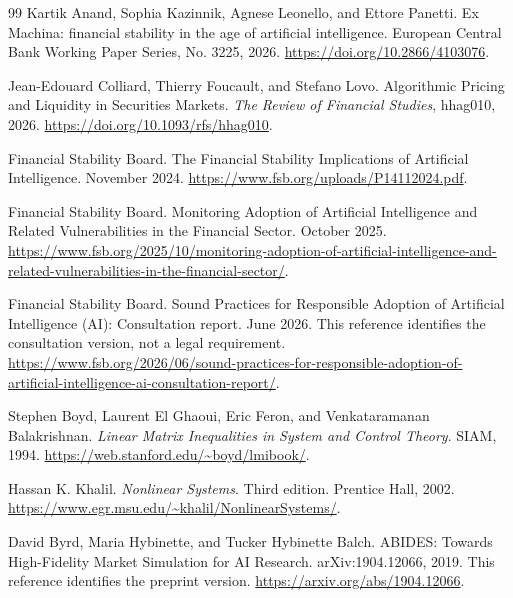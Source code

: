 \documentclass[11pt,a4paper]{article}
\theoremstyle{definition}
\theoremstyle{remark}
\begin{document}
\begin{thebibliography}{99}
Kartik Anand, Sophia Kazinnik, Agnese Leonello, and Ettore Panetti.
\newblock Ex Machina: financial stability in the age of artificial intelligence.
\newblock European Central Bank Working Paper Series, No. 3225, 2026.
\newblock \url{https://doi.org/10.2866/4103076}.

Jean-Edouard Colliard, Thierry Foucault, and Stefano Lovo.
\newblock Algorithmic Pricing and Liquidity in Securities Markets.
\newblock \emph{The Review of Financial Studies}, hhag010, 2026.
\newblock \url{https://doi.org/10.1093/rfs/hhag010}.

Financial Stability Board.
\newblock The Financial Stability Implications of Artificial Intelligence.
 November 2024.
\newblock \url{https://www.fsb.org/uploads/P14112024.pdf}.

Financial Stability Board.
\newblock Monitoring Adoption of Artificial Intelligence and Related Vulnerabilities in the Financial Sector.
 October 2025.
\newblock \url{https://www.fsb.org/2025/10/monitoring-adoption-of-artificial-intelligence-and-related-vulnerabilities-in-the-financial-sector/}.

Financial Stability Board.
\newblock Sound Practices for Responsible Adoption of Artificial Intelligence (AI): Consultation report.
 June 2026. This reference identifies the consultation version, not a legal requirement.
\newblock \url{https://www.fsb.org/2026/06/sound-practices-for-responsible-adoption-of-artificial-intelligence-ai-consultation-report/}.

Stephen Boyd, Laurent El Ghaoui, Eric Feron, and Venkataramanan Balakrishnan.
\newblock \emph{Linear Matrix Inequalities in System and Control Theory}.
\newblock SIAM, 1994.
\newblock \url{https://web.stanford.edu/~boyd/lmibook/}.

Hassan K. Khalil.
\newblock \emph{Nonlinear Systems}. Third edition.
\newblock Prentice Hall, 2002.
\newblock \url{https://www.egr.msu.edu/~khalil/NonlinearSystems/}.

David Byrd, Maria Hybinette, and Tucker Hybinette Balch.
\newblock ABIDES: Towards High-Fidelity Market Simulation for AI Research.
\newblock arXiv:1904.12066, 2019. This reference identifies the preprint version.
\newblock \url{https://arxiv.org/abs/1904.12066}.


\end{thebibliography}
\end{document}
